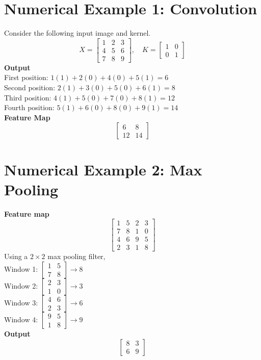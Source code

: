 \documentclass[11pt]{article}
\begin{document}
\section{Numerical Example 1: Convolution}
Consider the following input image and kernel. 
$$ X = \begin{bmatrix} 1 & 2 & 3 \\ 4 & 5 & 6 \\ 7 & 8 & 9 \end{bmatrix}, \quad K = \begin{bmatrix} 1 & 0 \\ 0 & 1 \end{bmatrix} $$
\textbf{Output} \\
First position: $1(1) + 2(0) + 4(0) + 5(1) = 6$  \\
Second position: $2(1) + 3(0) + 5(0) + 6(1) = 8$  \\
Third position: $4(1) + 5(0) + 7(0) + 8(1) = 12$  \\
Fourth position: $5(1) + 6(0) + 8(0) + 9(1) = 14$  \\[0.2cm]
\textbf{Feature Map}
$$ \begin{bmatrix} 6 & 8 \\ 12 & 14 \end{bmatrix} $$ 

\section{Numerical Example 2: Max Pooling}
\textbf{Feature map}
$$ \begin{bmatrix} 1 & 5 & 2 & 3 \\ 7 & 8 & 1 & 0 \\ 4 & 6 & 9 & 5 \\ 2 & 3 & 1 & 8 \end{bmatrix} $$ 
Using a $2\times2$ max pooling filter,  \\
Window 1: $\begin{bmatrix} 1 & 5 \\ 7 & 8 \end{bmatrix} \rightarrow 8$  \\
Window 2: $\begin{bmatrix} 2 & 3 \\ 1 & 0 \end{bmatrix} \rightarrow 3$  \\
Window 3: $\begin{bmatrix} 4 & 6 \\ 2 & 3 \end{bmatrix} \rightarrow 6$  \\
Window 4: $\begin{bmatrix} 9 & 5 \\ 1 & 8 \end{bmatrix} \rightarrow 9$  \\[0.2cm]
\textbf{Output}
$$ \begin{bmatrix} 8 & 3 \\ 6 & 9 \end{bmatrix} $$ 
\end{document}
